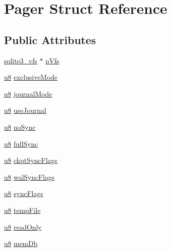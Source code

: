\hypertarget{struct_pager}{\section{Pager Struct Reference}
\label{struct_pager}
}
\subsection*{Public Attributes}
\begin{DoxyCompactItemize}
\item 
\hyperlink{structsqlite3__vfs}{sqlite3\-\_\-vfs} $\ast$ \hyperlink{struct_pager_affa78e08a7f691a4c8f7043e0b4c9212}{p\-Vfs}
\item 
\hyperlink{sqlite3_8c_a74a0f6424ae628af25f23f0a35f6ead3}{u8} \hyperlink{struct_pager_a5cbccc156e07d6226cb65a7ab05ac116}{exclusive\-Mode}
\item 
\hyperlink{sqlite3_8c_a74a0f6424ae628af25f23f0a35f6ead3}{u8} \hyperlink{struct_pager_a9ad7bd09f1c9323d943ee17ddf42e46e}{journal\-Mode}
\item 
\hyperlink{sqlite3_8c_a74a0f6424ae628af25f23f0a35f6ead3}{u8} \hyperlink{struct_pager_af7783f866150d7e322c28cb324ad85d6}{use\-Journal}
\item 
\hyperlink{sqlite3_8c_a74a0f6424ae628af25f23f0a35f6ead3}{u8} \hyperlink{struct_pager_ae943093a3ccbfbf264ccf3c8a52edac1}{no\-Sync}
\item 
\hyperlink{sqlite3_8c_a74a0f6424ae628af25f23f0a35f6ead3}{u8} \hyperlink{struct_pager_abae5c9c3d85120ae266acc4c9a355b86}{full\-Sync}
\item 
\hyperlink{sqlite3_8c_a74a0f6424ae628af25f23f0a35f6ead3}{u8} \hyperlink{struct_pager_a4543ec92953e7bda49b3ed4f0bdab890}{ckpt\-Sync\-Flags}
\item 
\hyperlink{sqlite3_8c_a74a0f6424ae628af25f23f0a35f6ead3}{u8} \hyperlink{struct_pager_aa8c8c2d893e4d2165f089ddde3e85103}{wal\-Sync\-Flags}
\item 
\hyperlink{sqlite3_8c_a74a0f6424ae628af25f23f0a35f6ead3}{u8} \hyperlink{struct_pager_ac7f90d27da63090369a0e44a0bceb525}{sync\-Flags}
\item 
\hyperlink{sqlite3_8c_a74a0f6424ae628af25f23f0a35f6ead3}{u8} \hyperlink{struct_pager_a9caa1abb43f6e839dd9a265c27b0b9e4}{temp\-File}
\item 
\hyperlink{sqlite3_8c_a74a0f6424ae628af25f23f0a35f6ead3}{u8} \hyperlink{struct_pager_ad7a7013309fd80a2a01844e69e8e7398}{read\-Only}
\item 
\hyperlink{sqlite3_8c_a74a0f6424ae628af25f23f0a35f6ead3}{u8} \hyperlink{struct_pager_abca3633b7745075aa5cf432b3fae54f2}{mem\-Db}

\end{DoxyCompactItemize}
